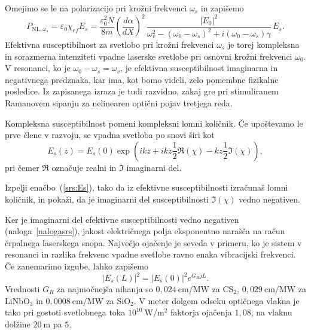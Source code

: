 Omejimo se le na polarizacijo pri krožni frekvenci $\omega_s$ in zapišemo
\begin{equation}
P_{\mathrm{NL},\omega_s} = \varepsilon_0 \chi_{ef}E_s = 
\frac{\varepsilon_0^2 N }{8m}\left(\frac{d\alpha}{dX}\right)^2 \, 
\frac{|E_0|^2}{\omega_v^2-(\omega_0-\omega_s)^2+i(\omega_0-\omega_s)\gamma}\,E_s.
\label{srs:chi}
\end{equation}
Efektivna susceptibilnost za svetlobo pri krožni frekvenci $\omega_s$ 
je  torej kompleksna in sorazmerna intenziteti 
vpadne laserske svetlobe pri osnovni krožni frekvenci $\omega_0$. 
V resonanci, ko je $\omega_0-\omega_s = \omega_v$, je efektivna susceptibilnost
imaginarna in negativnega predznaka, kar ima, kot bomo videli, zelo pomembne 
fizikalne posledice. Iz zapisanega izraza je tudi razvidno, zakaj gre pri 
stimuliranem Ramanovem sipanju za nelinearen optični pojav tretjega reda. 
\pagebreak

Kompleksna susceptibilnost pomeni kompleksni lomni količnik. Če upoštevamo
le prve člene v razvoju, se vpadna svetloba po snovi širi kot
\begin{equation}
E_s(z) = E_s(0)\exp\left(i k z + ikz\frac{1}{2}\Re(\chi)- k z \frac{1}{2}\Im(\chi)\right),
\label{srs:Es}
\end{equation}
pri čemer $\Re$ označuje realni in $\Im$ imaginarni del.
\begin{definition}
\label{nalogasrs}
 Izpelji enačbo~(\ref{srs:Es}), tako da iz efektivne susceptibilnosti izračunaš lomni količnik,
in pokaži, da je imaginarni del susceptibilnosti $\Im(\chi)$ vedno negativen. 
\end{definition}
Ker je imaginarni del efektivne susceptibilnosti vedno negativen (naloga~\ref{nalogasrs}), 
jakost električnega polja eksponentno narašča na račun črpalnega laserskega snopa. 
Največjo ojačenje je seveda v primeru, ko je sistem v resonanci
in razlika frekvenc vpadne svetlobe ravno enaka vibracijski frekvenci.
Če zanemarimo izgube, lahko zapišemo
\begin{equation}
|E_s(L)|^2 = |E_s(0)|^2 e^{G_RjL}.
\end{equation}
Vrednosti $G_R$ za najmočnejša nihanja so $0,024~\si{\cm/\mega\watt}$ za CS$_2$, 
$0,029~\si{\cm/\mega\watt}$ za LiNbO$_3$ 
in $0,0008~\si{\cm/\mega\watt}$ za SiO$_2$. 
V meter dolgem odseku optičnega vlakna je tako pri gostoti svetlobnega toka 
$10^{10}~\si{\watt/\meter^2}$  faktorja ojačenja $1,08$, na vlaknu dolžine $20~\si{\metre}$
pa $5$.

